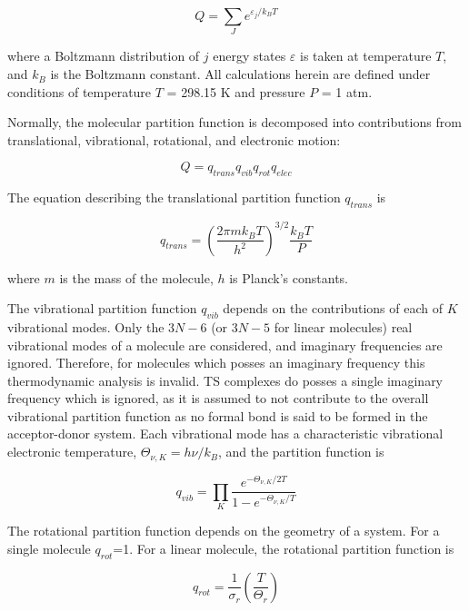 \begin{equation}
  Q = \sum_J e^{\varepsilon_j/k_B T}
\end{equation}

\noindent where a Boltzmann distribution of $j$ energy states $\varepsilon$ is
taken at temperature $T$, and $k_B$ is the Boltzmann constant. All calculations
herein are defined under conditions of temperature $T$ = 298.15 K and pressure
$P$ = 1 atm.

Normally, the molecular partition function is decomposed into contributions
from translational, vibrational, rotational, and electronic motion:

\begin{equation}
  Q = q_{trans}q_{vib}q_{rot}q_{elec}
\end{equation}

\noindent The equation describing the translational partition function
$q_{trans}$ is

\begin{equation}
  q_{trans} = \left( \frac{2\pi m k_B T}{h^2} \right)^{3/2} \frac{k_B T}{P}
\end{equation}

\noindent where $m$ is the mass of the molecule, $h$ is Planck's constants.

The vibrational partition function $q_{vib}$ depends on the contributions of
each of $K$ vibrational modes. Only the $3N-6$ (or $3N-5$ for linear molecules)
real vibrational modes of a molecule are considered, and imaginary frequencies
are ignored. Therefore, for molecules which posses an imaginary frequency this
thermodynamic analysis is invalid. TS complexes do posses a single imaginary
frequency which is ignored, as it is assumed to not contribute to the overall
vibrational partition function as no formal bond is said to be formed in the
acceptor-donor system. Each vibrational mode has a characteristic vibrational
electronic temperature, $\Theta_{\nu,K} = h\nu/k_B$, and the partition function
is

\begin{equation}
  q_{vib} = \prod_K \frac{e^{-\Theta_{\nu,K}/2T}}{1 - e^{-\Theta_{\nu,K}/T}}
\end{equation}

The rotational partition function depends on the geometry of a system. For a
single molecule $q_{rot}$=1. For a linear molecule, the rotational partition
function is

\begin{equation}
  q_{rot} = \frac{1}{\sigma_r} \left(\frac{T}{\Theta_r}\right)
\end{equation}

